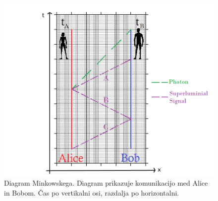 \documentclass[12pt]{article}
\begin{document}
\begin{figure}[h]
\includegraphics[width=12cm]{special-relativity.png}
\centering
\caption{Diagram Minkowskega. Diagram prikazuje komunikacijo med Alice in Bobom. Čas po vertikalni osi, razdalja po horizontalni. \cite{marcocerezoEntanglementHowIt2015}}
\label{fig:minkowski}
\end{figure}
\end{document}
